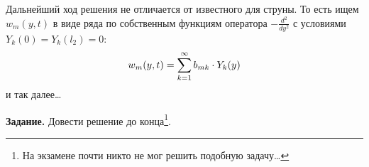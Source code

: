 \documentclass[12pt,a4paper,openany,fleqn]{book}
\newcommand{\dder}[2]{\ensuremath{\frac{d^2#1}{d#2^2}}}
\theoremstyle{definition}
\begin{document}
	Дальнейший ход решения не отличается от известного для струны. То есть ищем $w_m(y,t)$ в виде ряда по собственным функциям оператора $\displaystyle-\dder{}{y}$ с условиями $Y_k(0)=Y_k(l_2)=0$:
	\begin{equation*}
		\hfill w_m(y,t)=\sum\limits_{k=1}^{\infty}b_{mk}\cdot Y_k(y)\hfill
	\end{equation*}
	и так далее\dots
	\vspace{0.2cm}
	
	\noindent\textbf{Задание.} Довести решение до конца\footnote{На экзамене почти никто не мог решить подобную задачу\dots}.
\end{document}
